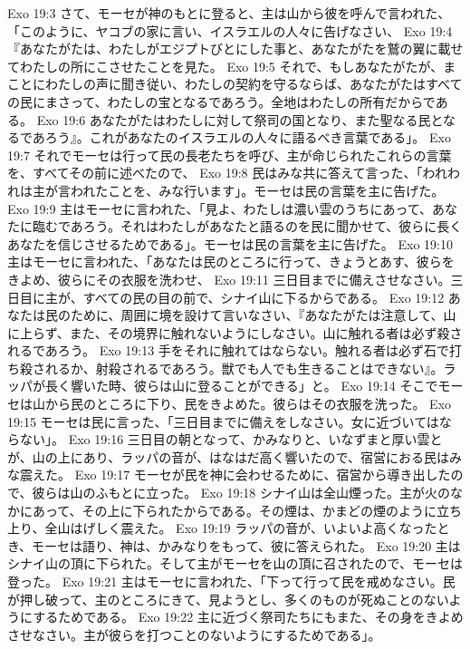 Exo 19:3  さて、モーセが神のもとに登ると、主は山から彼を呼んで言われた、「このように、ヤコブの家に言い、イスラエルの人々に告げなさい、
Exo 19:4  『あなたがたは、わたしがエジプトびとにした事と、あなたがたを鷲の翼に載せてわたしの所にこさせたことを見た。
Exo 19:5  それで、もしあなたがたが、まことにわたしの声に聞き従い、わたしの契約を守るならば、あなたがたはすべての民にまさって、わたしの宝となるであろう。全地はわたしの所有だからである。
Exo 19:6  あなたがたはわたしに対して祭司の国となり、また聖なる民となるであろう』。これがあなたのイスラエルの人々に語るべき言葉である」。
Exo 19:7  それでモーセは行って民の長老たちを呼び、主が命じられたこれらの言葉を、すべてその前に述べたので、
Exo 19:8  民はみな共に答えて言った、「われわれは主が言われたことを、みな行います」。モーセは民の言葉を主に告げた。
Exo 19:9  主はモーセに言われた、「見よ、わたしは濃い雲のうちにあって、あなたに臨むであろう。それはわたしがあなたと語るのを民に聞かせて、彼らに長くあなたを信じさせるためである」。モーセは民の言葉を主に告げた。
Exo 19:10  主はモーセに言われた、「あなたは民のところに行って、きょうとあす、彼らをきよめ、彼らにその衣服を洗わせ、
Exo 19:11  三日目までに備えさせなさい。三日目に主が、すべての民の目の前で、シナイ山に下るからである。
Exo 19:12  あなたは民のために、周囲に境を設けて言いなさい、『あなたがたは注意して、山に上らず、また、その境界に触れないようにしなさい。山に触れる者は必ず殺されるであろう。
Exo 19:13  手をそれに触れてはならない。触れる者は必ず石で打ち殺されるか、射殺されるであろう。獣でも人でも生きることはできない』。ラッパが長く響いた時、彼らは山に登ることができる」と。
Exo 19:14  そこでモーセは山から民のところに下り、民をきよめた。彼らはその衣服を洗った。
Exo 19:15  モーセは民に言った、「三日目までに備えをしなさい。女に近づいてはならない」。
Exo 19:16  三日目の朝となって、かみなりと、いなずまと厚い雲とが、山の上にあり、ラッパの音が、はなはだ高く響いたので、宿営におる民はみな震えた。
Exo 19:17  モーセが民を神に会わせるために、宿営から導き出したので、彼らは山のふもとに立った。
Exo 19:18  シナイ山は全山煙った。主が火のなかにあって、その上に下られたからである。その煙は、かまどの煙のように立ち上り、全山はげしく震えた。
Exo 19:19  ラッパの音が、いよいよ高くなったとき、モーセは語り、神は、かみなりをもって、彼に答えられた。
Exo 19:20  主はシナイ山の頂に下られた。そして主がモーセを山の頂に召されたので、モーセは登った。
Exo 19:21  主はモーセに言われた、「下って行って民を戒めなさい。民が押し破って、主のところにきて、見ようとし、多くのものが死ぬことのないようにするためである。
Exo 19:22  主に近づく祭司たちにもまた、その身をきよめさせなさい。主が彼らを打つことのないようにするためである」。
